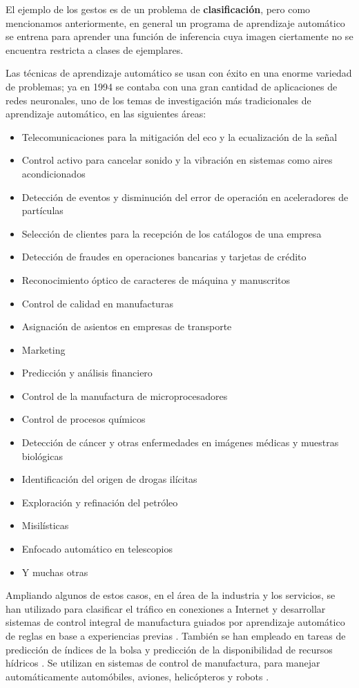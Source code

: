 
El ejemplo de los gestos es de un problema de \textbf{clasificación}, pero como mencionamos anteriormente, en general un programa de aprendizaje automático se entrena para aprender una función de inferencia cuya imagen ciertamente no se encuentra restricta a clases de ejemplares. 

Las técnicas de aprendizaje automático se usan con éxito en una enorme variedad de problemas; ya en 1994 se contaba con una gran cantidad de aplicaciones de redes neuronales, uno de los temas de investigación más tradicionales de aprendizaje automático, en las siguientes áreas\cite{widrow1994}:
\begin{itemize}
\item Telecomunicaciones para la mitigación del eco y la ecualización de la señal
\item Control activo para cancelar sonido y la vibración en sistemas como aires acondicionados
\item Detección de eventos y disminución del error de operación en aceleradores de partículas
\item Selección de clientes para la recepción de los catálogos de una empresa
\item Detección de fraudes en operaciones bancarias y tarjetas de crédito
\item Reconocimiento óptico de caracteres de máquina y manuscritos
\item Control de calidad en manufacturas
\item Asignación de asientos en empresas de transporte
\item Marketing
\item Predicción y análisis financiero
\item Control de la manufactura de microprocesadores
\item Control de procesos químicos
\item Detección de cáncer y otras enfermedades en imágenes médicas y muestras biológicas
\item Identificación del origen de drogas ilícitas
\item Exploración y refinación del petróleo
\item Misilísticas
\item Enfocado automático en telescopios
\item Y muchas otras
\end{itemize}

Ampliando algunos de estos casos, en el área de la industria y los servicios, se han utilizado para clasificar el tráfico en conexiones a Internet \cite{yuan2010} y desarrollar sistemas de control integral de manufactura guiados por aprendizaje automático de reglas en base a experiencias previas \cite{shiue2012}. También se han empleado en tareas de predicción de índices de la bolsa \cite{kim2000} y predicción de la disponibilidad de recursos hídricos \cite{maier2000}. Se utilizan en sistemas de control de manufactura, para manejar automáticamente automóbiles, aviones, helicópteros y robots \cite{pomerleau1991,pomerleau1993,azlan1999,rahideh2012}. 

